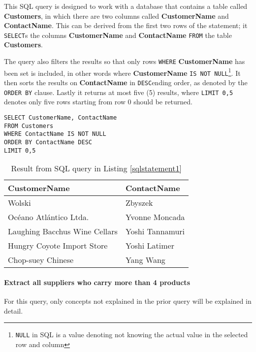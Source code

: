 This SQL query is designed to work with a database that contains a table
called \textbf{Customers}, in which there are two columns called
\textbf{CustomerName} and \textbf{ContactName}. This can be derived
from the first two rows of the statement; it \texttt{SELECT}s the
columns \textbf{CustomerName} and \textbf{ContactName} \texttt{FROM}
the table \textbf{Customers}.

The query also filters the results so that only rows \texttt{WHERE}
\textbf{CustomerName} has been set is included, in other words where
\textbf{CustomerName} \texttt{IS NOT NULL}\footnote{\texttt{NULL} in SQL is a
  value denoting not knowing the actual value in the selected row and column}.
It then sorts the results on \textbf{ContactName} in \texttt{DESC}ending order,
as denoted by the \texttt{ORDER BY} clause. Lastly it returns at most five (5)
results, where \texttt{LIMIT 0,5} denotes only five rows starting from row 0
should be returned.

\begin{lstlisting}[caption={Query for retreiving the name of five customers and their contact person},label={sqlstatement1}]
SELECT CustomerName, ContactName
FROM Customers
WHERE ContactName IS NOT NULL
ORDER BY ContactName DESC
LIMIT 0,5
\end{lstlisting}

\begin{table}[h]
  \centering
  \begin{tabular}{ | l | l | }
    \hline
    \textbf{CustomerName} & \textbf{ContactName} \\
    \hline
    Wolski & Zbyszek  \\
    \hline
    Océano Atlántico Ltda. & Yvonne Moncada \\
    \hline
    Laughing Bacchus Wine Cellars & Yoshi Tannamuri \\
    \hline
    Hungry Coyote Import Store & Yoshi Latimer \\
    \hline
    Chop-suey Chinese & Yang Wang \\
    \hline
  \end{tabular}
  \caption{Result from SQL query in Listing \ref{sqlstatement1}}
  \label{table:sql1}
\end{table}


\paragraph{Extract all suppliers who carry more than 4 products}
For this query, only concepts not explained in the prior query will be
explained in detail.

